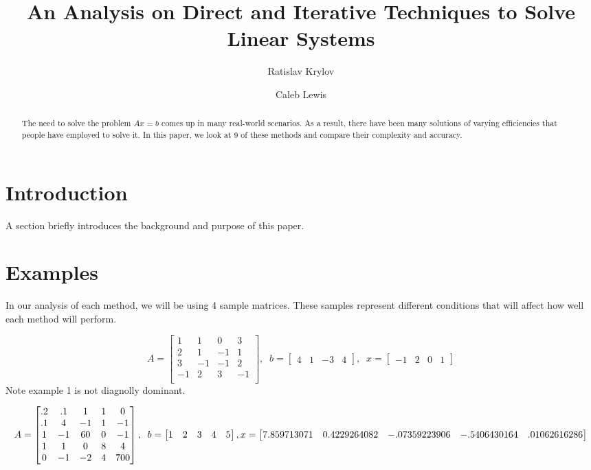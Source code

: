 \documentclass[11pt]{article}	%
\title{An Analysis on Direct and Iterative Techniques to Solve Linear Systems}
\author{Ratislav Krylov \and Caleb Lewis}
\begin{document}
\maketitle

\begin{abstract}
    The need to solve the problem $Ax = b$ comes up in many real-world scenarios.
    As a result, there have been many solutions of varying efficiencies that people
    have employed to solve it. In this paper, we look at 9 of these methods and
    compare their complexity and accuracy.
\end{abstract}

\section{Introduction}
A section briefly introduces the background and purpose of this paper.

\section{Examples}
In our analysis of each method, we will be using 4 sample matrices. These samples represent different conditions that will affect how well each method will perform.

\begin{equation}\label{eq:sample1}
    A = \begin{bmatrix}
            1 & 1 & 0 & 3 \\
            2 & 1 &  -1 & 1 \\
            3 & -1 & -1 & 2 \\
            -1 & 2 & 3 & -1  \\
        \end{bmatrix}
    ,\;\;
    b = \begin{bmatrix}
            4 & 1 & -3 & 4
        \end{bmatrix}
    ,\;\;
    x = \begin{bmatrix}
            -1 & 2 & 0 & 1
        \end{bmatrix}
\end{equation}
Note example 1 is not diagnolly dominant.

\begin{equation}\label{eq:sample2}
    A = \begin{bmatrix}
            .2 & .1 & 1 & 1 & 0 \\
            .1 & 4 & -1 & 1 & -1 \\
            1 & -1 & 60 & 0 & -1 \\
            1 & 1 & 0 & 8 & 4  \\
            0 & -1 & -2 & 4 & 700  \\
        \end{bmatrix}
    ,\;\;
    b = \begin{bmatrix}
            1 & 2 & 3 & 4 & 5
        \end{bmatrix}
    ,\\
    x = \begin{bmatrix}
            7.859713071 & 0.4229264082 & -.07359223906 & -.5406430164 & .01062616286
        \end{bmatrix}
\end{equation}
\end{document}
